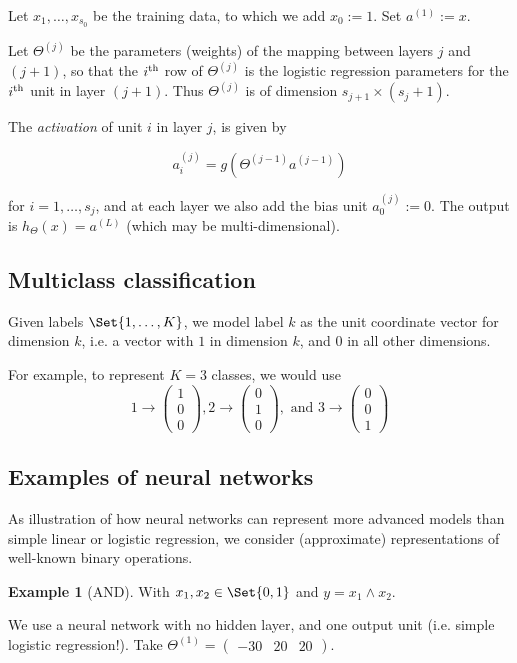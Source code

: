 \documentclass[a4paper,12pt]{article}
\theoremstyle{definition}
\newtheorem*{ex}{Example}
\begin{document}
Let $x_1, \ldots, x_{s_0}$ be the training data, to which we add $x_0 := 1$. Set $a^{(1)} := x$. 

Let $\Theta^{(j)}$ be the parameters (weights) of the mapping between layers $j$ and $(j+1)$, so that the $i\textsuperscript{th}$ row of $\Theta^{(j)}$ is the logistic regression parameters for the $i\textsuperscript{th}$ unit in layer $(j+1)$. Thus $\Theta^{(j)}$ is of dimension $s_{j+1} \times (s_{j} + 1)$.

The \emph{activation} of unit $i$ in layer $j$, is given by

\[
a_i^{(j)} = g(\Theta^{(j-1)} a^{(j-1)})
\]

for $i = 1, \ldots, s_j$, and at each layer we also add the bias unit $a_0^{(j)} := 0$. The output is $h_\Theta(x) = a^{(L)}$ (which may be multi-dimensional).

\subsection{Multiclass classification}
\label{nn-multiclass}
Given labels $\Set{1, \ldots, K}$, we model label $k$ as the unit coordinate vector for dimension $k$, i.e. a vector with $1$ in dimension $k$, and $0$ in all other dimensions.

For example, to represent $K = 3$ classes, we would use 
\[
1 \to \begin{pmatrix} 1 \\ 0 \\ 0 \end{pmatrix},
2 \to \begin{pmatrix} 0 \\ 1 \\ 0 \end{pmatrix}, \text{ and }
3 \to \begin{pmatrix} 0 \\ 0 \\ 1 \end{pmatrix} 
\]

\subsection{Examples of neural networks}
As illustration of how neural networks can represent more advanced models than simple linear or logistic regression, we consider (approximate) representations of well-known binary operations.
\begin{ex}[AND]
With $x_1, x_2 \in \Set{0, 1}$ and $y = x_1 \land x_2$. 

We use a neural network with no hidden layer, and one output unit (i.e. simple logistic regression!). Take $\Theta^{(1)} = \begin{pmatrix} -30 & 20 & 20 \end{pmatrix}$.
\end{ex}
\end{document}
